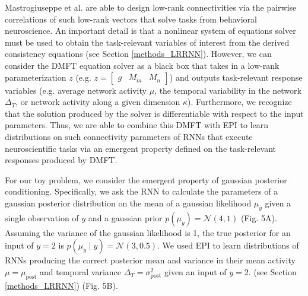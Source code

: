 \documentclass[11pt]{article}
\begin{document}
Mastrogiuseppe et al. are able to design low-rank connectivities via the pairwise correlations of such low-rank vectors that solve tasks from behavioral neuroscience. 
An important detail is that a nonlinear system of equations solver must be used to obtain the task-relevant variables of interest from the derived consistency equations (see Section \ref{methods_LRRNN}).
However, we can consider the DMFT equation solver as a black box that takes in a low-rank parameterization $z$ (e.g. $z = \begin{bmatrix} g & M_m & M_n \end{bmatrix}$)  and outputs task-relevant response variables (e.g. average network activity $\mu$, the temporal variability in the network $\Delta_T$, or network activity along a given dimension $\kappa$).
Furthermore, we recognize that the solution produced by the solver is differentiable with respect to the input parameters. Thus, we are able to combine this DMFT with EPI to learn distributions on such connectivity parameters of RNNs that execute neuroscientific tasks via an emergent property defined on the task-relevant responses produced by DMFT.


For our toy problem, we consider the emergent property of  gaussian posterior conditioning.  Specifically, we ask the RNN to calculate the parameters of a gaussian posterior distribution on the mean of a gaussian likelihood $\mu_y$ given a single observation of $y$ and a gaussian prior $p(\mu_y) = \mathcal{N}(4, 1)$ (Fig. 5A).  Assuming the variance of the gaussian likelihood is 1, the true posterior for an input of $y=2$ is $p(\mu_y \mid y) = \mathcal{N}(3, 0.5)$.  We used EPI to learn distributions of RNNs producing the correct posterior mean and variance  in their mean activity $\mu=\mu_{\text{post}}$ and temporal variance $\Delta_T=\sigma^2_{\text{post}}$ given an input of $y=2$. (see Section \ref{methods_LRRNN}) (Fig. 5B).
\end{document}
